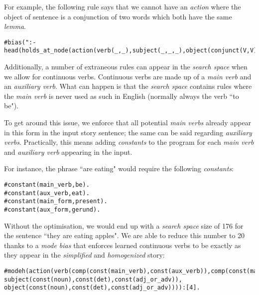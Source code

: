For example, the following rule says that we cannot have an \textit{action} where the object of sentence is a conjunction of two words which both have the same \textit{lemma}.

\begin{displayquote}
\begin{lstlisting}[numbers=none]
#bias(":- head(holds_at_node(action(verb(_,_),subject(_,_,_),object(conjunct(V,V),_,_)),var__(1))).").
\end{lstlisting}
\end{displayquote}

\noindent
Additionally, a number of extraneous rules can appear in the \textit{search space} when we allow for continuous verbs. Continuous verbs are made up of a \textit{main verb} and an \textit{auxiliary verb}. What can happen is that the \textit{search space} contains rules where the \textit{main verb} is never used as such in English (normally always the verb ``to be").

To get around this issue, we enforce that all potential \textit{main verbs} already appear in this form in the input story sentence; the same can be said regarding \textit{auxiliary verbs}. Practically, this means adding \textit{constants} to the program for each \textit{main verb} and \textit{auxiliary verb} appearing in the input.

For instance, the phrase ``are eating" would require the following \textit{constants}:

\begin{displayquote}
\begin{lstlisting}
#constant(main_verb,be).
#constant(aux_verb,eat).
#constant(main_form,present).
#constant(aux_form,gerund).
\end{lstlisting}
\end{displayquote}

\noindent
Without the optimisation, we would end up with a \textit{search space} size of 176 for the sentence ``they are eating apples". We are able to reduce this number to 20 thanks to a \textit{mode bias} that enforces learned continuous verbs to be exactly as they appear in the \textit{simplified} and \textit{homogenized} story:

\begin{displayquote}
\begin{lstlisting}[numbers=none]
#modeh(action(verb(comp(const(main_verb),const(aux_verb)),comp(const(main_form),const(aux_form))), subject(const(noun),const(det),const(adj_or_adv)), object(const(noun),const(det),const(adj_or_adv)))):[4].
\end{lstlisting}
\end{displayquote} 

